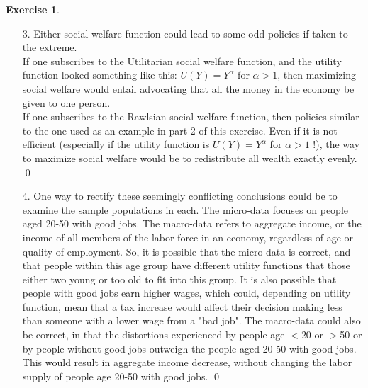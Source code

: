 \documentclass[12pt]{article}
\theoremstyle{definition}
\newtheorem{exercise}[theorem]{Exercise}
\newcommand{\V}{\vspace{0.3cm}\\}
\begin{document}
\begin{exercise}
\begin{enumerate}
    Under the Utilitarian social welfare function, $W_A > W_B$. \V
    Under the Max-Min or Rawlsian social welfare function, social welfare $W = \min(U(Y))$. \\
    Then $W_A = \min(U(Y_A)) = \min(\{25,25,25,25,25,25,25,25,25,3025\}) = 25$. \\
    And $W_B = \min(U(Y_B)) = \min(\{100,100,100,100,100,100,100,100,100,100\}) = 100$. \\
    Under the Rawlsian social welfare funtion, $W_B > W_A$. \qed
    \item [3.] Either social welfare function could lead to some odd policies if taken to the extreme.\\ If one subscribes to the Utilitarian social welfare function, and the utility function looked something like this: $U(Y) = Y^\alpha$ for $\alpha > 1$, then maximizing social welfare would entail advocating that all the money in the economy be given to one person. \\
    If one subscribes to the Rawlsian social welfare function, then policies similar to the one used as an example in part 2 of this exercise. Even if it is not efficient (especially if the utility function is $U(Y) = Y^\alpha$ for $\alpha >1$ !), the way to maximize social welfare would be to redistribute all wealth exactly evenly. \qed
    \item [4.] One way to rectify these seemingly conflicting conclusions could be to examine the sample populations in each. The micro-data focuses on people aged 20-50 with good jobs. The macro-data refers to aggregate income, or the income of all members of the labor force in an economy, regardless of age or quality of employment. So, it is possible that the micro-data is correct, and that people within this age group have different utility functions that those either two young or too old to fit into this group. It is also possible that people with good jobs earn higher wages, which could, depending on utility function, mean that a tax increase would affect their decision making less than someone with a lower wage from a "bad job". The macro-data could also be correct, in that the distortions experienced by people age $<$20 or $>$50 or by people without good jobs outweigh the people aged 20-50 with good jobs. This would result in aggregate income decrease, without changing the labor supply of people age 20-50 with good jobs. \qed
\end{enumerate}
\end{exercise}
\end{document}
